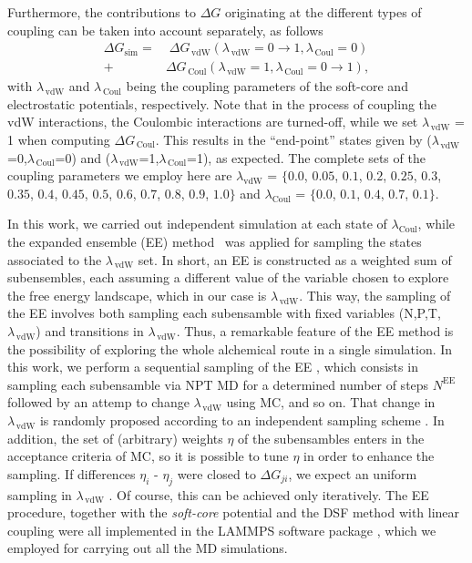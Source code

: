 \documentclass[3p,twocolumn]{elsarticle}
\begin{document}
Furthermore, the contributions to $\Delta G$ originating at the different types of coupling can be taken into account separately, as follows
\begin{equation}
\begin{split}
\Delta G_{\text{sim}} =& \; \Delta G_{\,\text{vdW}} (\lambda_{\,\text{vdW}} = 0\rightarrow  1, \lambda_{\, \text{Coul}} = 0) \\
+ \; &\Delta G_{\,\text{Coul}} (\lambda_{\, \text{vdW}} = 1,\lambda_{\,\text{Coul}} = 0 \rightarrow 1),
\end{split}
\end{equation}
with $\lambda_{\,\text{vdW}}$ and $\lambda_{\,\text{Coul}}$ being the coupling parameters of the soft-core and electrostatic potentials, respectively. Note that in the process of coupling the vdW interactions, the Coulombic interactions are turned-off, while we set $\lambda_{\,\text{vdW}}$ = 1 when computing $\Delta G_{\,\text{Coul}}$.  This results in the ``end-point'' states given by ($\lambda_{\,\text{vdW}}$=0,$\lambda_{\,\text{Coul}}$=0) and ($\lambda_{\,\text{vdW}}$=1,$\lambda_{\,\text{Coul}}$=1), as expected. The complete sets of the coupling parameters we employ here are $\lambda_{\text{vdW}}$ = $\{0.0$, $0.05$, $0.1$, $0.2$, $0.25$, $0.3$, $0.35$, $0.4$, $0.45$, $0.5$, $0.6$, $0.7$, $0.8$, $0.9$, $1.0\}$ and $\lambda_{\text{Coul}}$ = $\{0.0$, $0.1$, $0.4$, $0.7$, $0.1\}$.

In this work, we carried out independent simulation at each state of $\lambda_{\text{Coul}}$, while the expanded ensemble (EE) method~\cite{Lyubartsev_1992} was applied for sampling the states associated to the $\lambda_{\,\text{vdW}}$ set. In short, an EE is constructed as a weighted sum of subensembles, each assuming a different value of the variable chosen to explore the free energy landscape, which in our case is $\lambda_{\,\text{vdW}}$. This way, the sampling of the EE involves both sampling each subensamble with fixed variables (N,P,T,$\lambda_{\,\text{vdW}}$) and transitions in $\lambda_{\,\text{vdW}}$. Thus, a remarkable feature of the EE method is the possibility of exploring the whole alchemical route in a single simulation. In this work, we perform a sequential sampling of the EE \cite{Chodera_2011_2}, which consists in sampling each subensamble via NPT MD for a determined number of steps $N^{\text{EE}}$ followed by an attemp to change $\lambda_{\,\text{vdW}}$ using MC, and so on. That change in $\lambda_{\,\text{vdW}}$ is randomly proposed according to an independent sampling scheme \cite{Chodera_2011_2}. In addition, the set of (arbitrary) weights $\eta$ of the subensambles enters in the acceptance criteria of MC, so it is possible to tune $\eta$ in order to enhance the sampling. If differences $\eta_i$ - $\eta_j$ were closed to $\Delta G_{ji}$, we expect an uniform sampling in $\lambda_{\,\text{vdW}}$ \cite{Lyubartsev_1992}. Of course, this can be achieved only iteratively. The EE procedure, together with the \textit{soft-core} potential and the DSF method with linear coupling were all implemented in the LAMMPS software package \cite{Plimpton1995}, which we employed for carrying out all the MD simulations.
\end{document}
